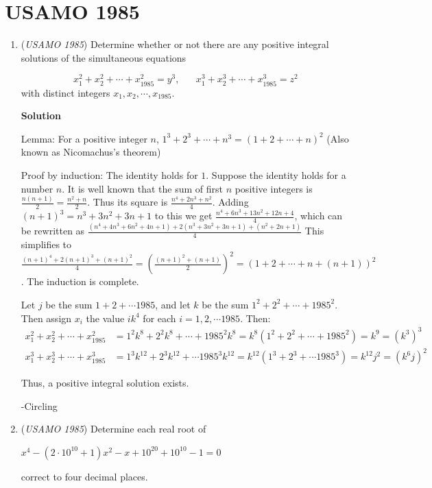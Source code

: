 \section{USAMO 1985}
        \begin{enumerate}
        	\item (\textit{USAMO 1985}) Determine whether or not there are any positive integral solutions of the simultaneous equations 

 \[x_1^2+x_2^2+\cdots+x_{1985}^2=y^3, \hspace{20pt} x_1^3+x_2^3+\cdots+x_{1985}^3=z^2\]
with distinct integers $x_1,x_2,\cdots,x_{1985}$.


 



\textbf{Solution}

Lemma: For a positive integer $n$, $1^3+2^3+\cdots +n^3 = (1+2+\cdots +n)^2$ (Also known as Nicomachus's theorem)

 Proof by induction: The identity holds for $1$. Suppose the identity holds for a number $n$. It is well known that the sum of first $n$ positive integers is $\frac{n(n+1)}{2} = \frac{n^2+n}{2}$. Thus its square is $\frac{n^4+2n^3+n^2}{4}$. Adding $(n+1)^3=n^3+3n^2+3n+1$ to this we get $\frac{n^4+6n^3+13n^2+12n+4}{4}$, which can be rewritten as $\frac{(n^4+4n^3+6n^2+4n+1)+2(n^3+3n^2+3n+1)+(n^2+2n+1)}{4}$ This simplifies to $\frac{(n+1)^4+2(n+1)^3+(n+1)^2}{4} = ({\frac{(n+1)^2+(n+1)}{2}})^2 = (1+2+\cdots +n+(n+1))^2$. The induction is complete.

 
Let $j$ be the sum $1+2+\cdots 1985$, and let $k$ be the sum $1^2 + 2^2 + \cdots + 1985^2$. Then assign $x_i$ the value $ik^4$ for each $i = 1, 2,\cdots 1985$. Then:
 \begin{align*} x_1^2 +x_2^2 +\cdots +x_{1985}^2 & = 1^2k^8 +2^2k^8+\cdots +1985^2k^8 = k^8(1^2+2^2+\cdots +1985^2) = k^9 = {(k^3)}^3\\ x_1^3 +x_2^3 +\cdots +x_{1985}^3 & = 1^3k^{12}+2^3k^{12}+\cdots 1985^3k^{12}=k^{12}(1^3+2^3+\cdots 1985^3) = k^{12}j^2 = ({k^6j})^2 \end{align*}


 Thus, a positive integral solution exists.

 -Circling

 


	\item (\textit{USAMO 1985}) Determine each real root of


 $x^4-(2\cdot10^{10}+1)x^2-x+10^{20}+10^{10}-1=0$


 correct to four decimal places.



\end{enumerate}
